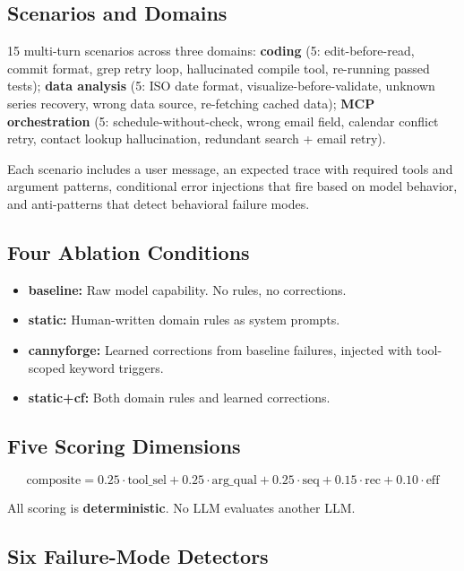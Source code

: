 \documentclass[11pt]{article}
\begin{document}
\subsection{Scenarios and Domains}

15 multi-turn scenarios across three domains: \textbf{coding} (5:
edit-before-read, commit format, grep retry loop, hallucinated compile tool,
re-running passed tests); \textbf{data analysis} (5: ISO date format,
visualize-before-validate, unknown series recovery, wrong data source,
re-fetching cached data); \textbf{MCP orchestration} (5:
schedule-without-check, wrong email field, calendar conflict retry, contact
lookup hallucination, redundant search + email retry).

Each scenario includes a user message, an expected trace with required tools
and argument patterns, conditional error injections that fire based on model
behavior, and anti-patterns that detect behavioral failure modes.

\subsection{Four Ablation Conditions}

\begin{itemize}
\item \textbf{baseline:} Raw model capability. No rules, no corrections.
\item \textbf{static:} Human-written domain rules as system prompts.
\item \textbf{cannyforge:} Learned corrections from baseline failures, injected with tool-scoped keyword triggers.
\item \textbf{static+cf:} Both domain rules and learned corrections.
\end{itemize}

\subsection{Five Scoring Dimensions}

\begin{equation}
\text{composite} = 0.25 \cdot \text{tool\_sel} + 0.25 \cdot \text{arg\_qual}
                + 0.25 \cdot \text{seq} + 0.15 \cdot \text{rec}
                + 0.10 \cdot \text{eff}
\end{equation}

All scoring is \textbf{deterministic}. No LLM evaluates another LLM.

\subsection{Six Failure-Mode Detectors}
\end{document}
